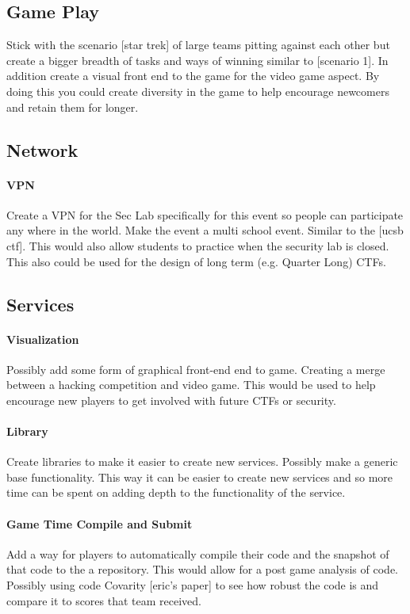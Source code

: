 \documentclass[10pt]{article}
\begin{document}
\subsection{Game Play}
Stick with the scenario [star trek] of large teams pitting against each other 
but create a bigger breadth of tasks and ways of winning similar to [scenario 1].
In addition create a visual front end to the game for the video game aspect.
By doing this you could create diversity in the game to help encourage newcomers
and retain them for longer.

\subsection{Network}

\paragraph{VPN}
Create a VPN for the Sec Lab specifically for this event so people can participate any where
in the world. Make the event a multi school event. Similar to the [ucsb ctf]. This would
also allow students to practice when the security lab is closed. This also could be used
for the design of long term (e.g. Quarter Long) CTFs.

\subsection{Services}

\paragraph{Visualization}
Possibly add some form of graphical front-end end to game. Creating a merge between
a hacking competition and video game. This would be used to help encourage new players
to get involved with future CTFs or security.

\paragraph{Library}
Create libraries to make it easier to create new services. Possibly make a generic base
functionality. This way it can be easier to create new services and so more time can
be spent on adding depth to the functionality of the service.

\paragraph{Game Time Compile and Submit}
Add a way for players to automatically compile their code and the snapshot of that code
to the a repository. This would allow for a post game analysis of code. Possibly using
code Covarity [eric's paper] to see how robust the code is and compare it to scores
that team received.
\end{document}
